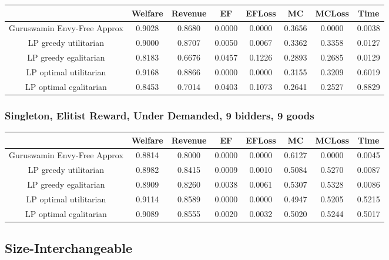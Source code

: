 \begin{tabular}{|c|c|c|c|c|c|c|c|}\hline
                            	&Welfare	&Revenue	&EF	&EFLoss	&MC	&MCLoss	&Time	\\\hline
   Guruswamin Envy-Free Approx	&0.9028	&0.8680	&0.0000	&0.0000	&0.3656	&0.0000	&0.0038	\\\hline 
         LP greedy utilitarian	&0.9000	&0.8707	&0.0050	&0.0067	&0.3362	&0.3358	&0.0127	\\\hline 
         LP greedy egalitarian	&0.8183	&0.6676	&0.0457	&0.1226	&0.2893	&0.2685	&0.0129	\\\hline 
        LP optimal utilitarian	&0.9168	&0.8866	&0.0000	&0.0000	&0.3155	&0.3209	&0.6019	\\\hline 
        LP optimal egalitarian	&0.8453	&0.7014	&0.0403	&0.1073	&0.2641	&0.2527	&0.8829	\\\hline 
\end{tabular}\subsubsection*{Singleton, Elitist Reward, Under Demanded, 9 bidders, 9 goods} 
\begin{tabular}{|c|c|c|c|c|c|c|c|}\hline
                            	&Welfare	&Revenue	&EF	&EFLoss	&MC	&MCLoss	&Time	\\\hline
   Guruswamin Envy-Free Approx	&0.8814	&0.8000	&0.0000	&0.0000	&0.6127	&0.0000	&0.0045	\\\hline 
         LP greedy utilitarian	&0.8982	&0.8415	&0.0009	&0.0010	&0.5084	&0.5270	&0.0087	\\\hline 
         LP greedy egalitarian	&0.8909	&0.8260	&0.0038	&0.0061	&0.5307	&0.5328	&0.0086	\\\hline 
        LP optimal utilitarian	&0.9114	&0.8589	&0.0000	&0.0000	&0.4947	&0.5205	&0.5215	\\\hline 
        LP optimal egalitarian	&0.9089	&0.8555	&0.0020	&0.0032	&0.5020	&0.5244	&0.5017	\\\hline 
\end{tabular}\newpage
\subsection{Size-Interchangeable}
